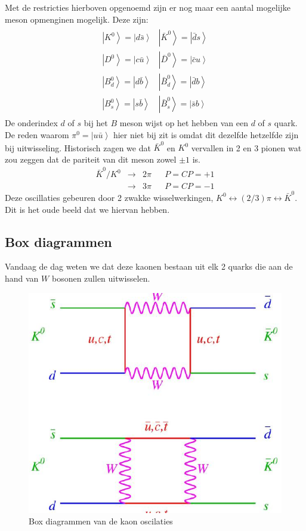 \documentclass[../main.tex]{subfiles}
\begin{document}
Met de restricties hierboven opgenoemd zijn er nog maar een aantal mogelijke meson opmenginen mogelijk. Deze zijn:
\begin{equation}
    \begin{aligned}
        \label{eq:mogelijke_meson_opmengingen}
        \begin{array}{ll}
            \left|K^{0}\right>=\left| d \bar{s}\right> & \left|\bar{K}^{0}\right>=\left| \bar{d} s\right> \\
            \left|D^{0}\right>=\left| c \bar{u}\right> & \left|\bar{D}^{0}\right>=\left| \bar{c} u\right> \\
            \left|B_{d}^{0}\right>=\left| d \bar{b}\right> & \left|\bar{B}_{d}^{0}\right>=\left| \bar{d} b\right> \\
            \left|B_{s}^{0}\right>=\left| s \bar{b}\right> & \left|\bar{B}_{s}^{0}\right>=\left| \bar{s} b\right>
        \end{array}
    \end{aligned}
\end{equation}
De onderindex $d$ of $s$ bij het $B$ meson wijst op het hebben van een $d$ of $s$ quark. De reden waarom $\pi^0=\left|u\bar{u}\right>$ hier niet bij zit is omdat dit dezelfde hetzelfde zijn bij uitwisseling. Historisch zagen we dat $\bar{K}^{0}$ en $K^{0}$ vervallen in 2 en 3 pionen wat zou zeggen dat de pariteit van dit meson zowel $\pm1$ is.
\begin{equation}
    \begin{aligned}
        \label{eq:kaon_pion_verval}
            \bar{K}^{0} / K^{0} & \rightarrow & 2 \pi & & P=C P=+1 \\
                                & \rightarrow & 3 \pi & & P=C P=-1
    \end{aligned}
\end{equation}
Deze oscillaties gebeuren door 2 zwakke wisselwerkingen, $K^{0} \leftrightarrow(2 / 3) \pi \leftrightarrow \bar{K}^{0}$. Dit is het oude beeld dat we hiervan hebben.

\subsection{Box diagrammen}%
\label{sub:box_diagrammen}

Vandaag de dag weten we dat deze kaonen bestaan uit elk 2 quarks die aan de hand van $W$ bosonen zullen uitwisselen.

\begin{figure}[h]
    \centering
    \includegraphics[width=0.4\linewidth]{meson_mixing_and_oscillations/box_diagrams.png}
    \caption{Box diagrammen van de kaon oscilaties}%
    \label{fig:meson_mixing_and_oscillations/box_diagrams}
\end{figure}
\end{document}
